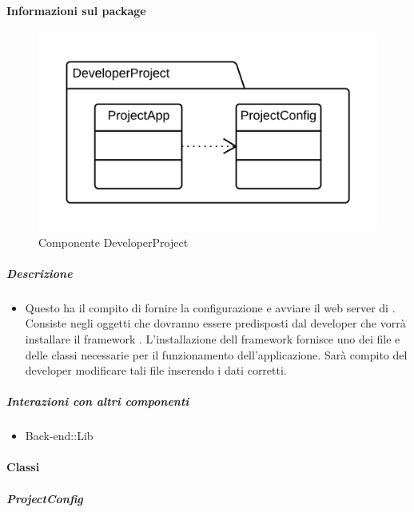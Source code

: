	\paragraph{Informazioni sul package} 
		\begin{figure}[H] 
			\begin{center} 
				\includegraphics[width=\textwidth]{uml/package/Back-end::DeveloperProject.png}  
				\caption{Componente DeveloperProject}
			\end{center}  
		\end{figure} 
	\subparagraph{Descrizione} 
		\begin{itemize}
		\item[] Questo  ha il compito di fornire la configurazione e avviare il web server di . Consiste negli oggetti che dovranno essere predisposti dal developer che vorrà installare il framework . L'installazione dell framework  fornisce uno  dei file e delle classi necessarie per il funzionamento dell'applicazione. Sarà compito del developer modificare tali file inserendo i dati corretti.
		\end{itemize} 
	\subparagraph{Interazioni con altri componenti} 
		\begin{itemize} 
				\item Back-end::Lib  
		\end{itemize} 
		\paragraph{Classi}
			\subparagraph{ProjectConfig}
				
